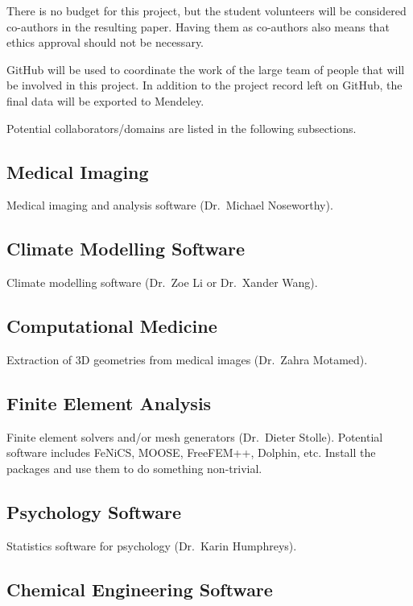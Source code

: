 \documentclass[12pt]{article}
\begin{document}
There is no budget for this project, but the student volunteers will be
considered co-authors in the resulting paper.  Having them as co-authors also
means that ethics approval should not be necessary.

GitHub will be used to coordinate the work of the large team of people that will
be involved in this project.  In addition to the project record left on GitHub,
the final data will be exported to Mendeley.

Potential collaborators/domains are listed in the following subsections.

\subsection{Medical Imaging}

Medical imaging and analysis software (Dr.\ Michael Noseworthy).

\subsection{Climate Modelling Software}

Climate modelling software (Dr.\ Zoe Li or Dr.\ Xander Wang).

\subsection{Computational Medicine}

Extraction of 3D geometries from medical images (Dr.\ Zahra Motamed).

\subsection{Finite Element Analysis}

Finite element solvers and/or mesh generators (Dr.\ Dieter Stolle).  Potential
software includes FeNiCS, MOOSE, FreeFEM++, Dolphin, etc.  Install the packages
and use them to do something non-trivial.

\subsection{Psychology Software}

Statistics software for psychology (Dr.\ Karin Humphreys).

\subsection{Chemical Engineering Software}
\end{document}
